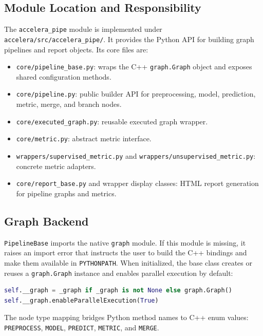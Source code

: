 \documentclass[11pt,a4paper]{article}
\newcommand{\modulepath}[1]{\texttt{#1}}
\begin{document}
\subsection{Module Location and Responsibility}

The \texttt{accelera\_pipe} module is implemented under
\modulepath{accelera/src/accelera\_pipe/}. It provides the Python API for
building graph pipelines and report objects. Its core files are:

\begin{itemize}[leftmargin=*]
  \item \modulepath{core/pipeline\_base.py}: wraps the C++ \texttt{graph.Graph}
        object and exposes shared configuration methods.
  \item \modulepath{core/pipeline.py}: public builder API for preprocessing,
        model, prediction, metric, merge, and branch nodes.
  \item \modulepath{core/executed\_graph.py}: reusable executed graph wrapper.
  \item \modulepath{core/metric.py}: abstract metric interface.
  \item \modulepath{wrappers/supervised\_metric.py} and
        \modulepath{wrappers/unsupervised\_metric.py}: concrete metric
        adapters.
  \item \modulepath{core/report\_base.py} and wrapper display classes:
        HTML report generation for pipeline graphs and metrics.
\end{itemize}

\subsection{Graph Backend}

\texttt{PipelineBase} imports the native \texttt{graph} module. If this module
is missing, it raises an import error that instructs the user to build the C++
bindings and make them available in \texttt{PYTHONPATH}. When initialized, the
base class creates or reuses a \texttt{graph.Graph} instance and enables
parallel execution by default:

\begin{lstlisting}[language=Python]
self.__graph = _graph if _graph is not None else graph.Graph()
self.__graph.enableParallelExecution(True)
\end{lstlisting}

The node type mapping bridges Python method names to C++ enum values:
\texttt{PREPROCESS}, \texttt{MODEL}, \texttt{PREDICT}, \texttt{METRIC}, and
\texttt{MERGE}.
\end{document}
